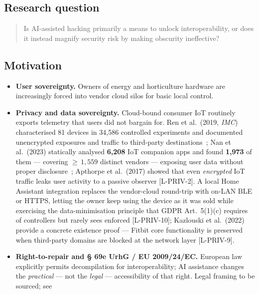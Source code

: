 \documentclass[11pt,a4paper]{article}
\begin{document}
\subsection{Research question}
\label{sec:research-question}
\begin{quote}
Is AI-assisted hacking primarily a means to unlock interoperability, or does
it instead magnify security risk by making obscurity ineffective?
\end{quote}

\subsection{Motivation}
\label{sec:motivation}
\begin{itemize}
  \item \textbf{User sovereignty.} Owners of energy and horticulture hardware
        are increasingly forced into vendor cloud silos for basic local
        control.
  \item \textbf{Privacy and data sovereignty.} Cloud-bound consumer IoT
        routinely exports telemetry that users did not bargain for.
        Ren et al.\ (2019, \emph{IMC}) characterised 81 devices in
        34{,}586 controlled experiments and documented unencrypted
        exposures and traffic to third-party
        destinations~\citep{ren2019iotinforming}; Nan et al.\ (2023)
        statically analysed \textbf{6{,}208} IoT companion apps and
        found \textbf{1{,}973} of them --- covering $\geq\,1{,}559$
        distinct vendors --- exposing user data without proper
        disclosure~\citep{nan2023iotapp}; Apthorpe et al.\ (2017) showed
        that even \emph{encrypted} IoT traffic leaks user activity to a
        passive observer [L-PRIV-2]. A local Home Assistant integration
        replaces the vendor-cloud round-trip with on-LAN BLE or HTTPS,
        letting the owner keep using the device as it was sold while
        exercising the data-minimisation principle that GDPR Art.\ 5(1)(c)
        requires of controllers but rarely sees enforced [L-PRIV-10];
        Kazlouski et al.\ (2022) provide a concrete existence proof ---
        Fitbit core functionality is preserved when third-party domains
        are blocked at the network layer [L-PRIV-9].
  \item \textbf{Right-to-repair and \S{} 69e UrhG / EU 2009/24/EC.} European
        law explicitly permits decompilation for interoperability; AI
        assistance changes the \emph{practical} --- not the \emph{legal} ---
        accessibility of that right. Legal framing to be sourced; see

\end{itemize}
\end{document}
